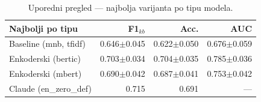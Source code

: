 \begin{table}[H]\centering
\caption{Uporedni pregled --- najbolja varijanta po tipu modela.}\label{tab:poredjenje}
\begin{tabular}{lrrr}
\toprule
Najbolji po tipu & F1$_{kb}$ & Acc. & AUC \\
\midrule
Baseline (mnb, tfidf) & 0.646$\pm$0.045 & 0.622$\pm$0.050 & 0.676$\pm$0.059 \\
Enkoderski (bertic) & 0.703$\pm$0.034 & 0.704$\pm$0.035 & 0.785$\pm$0.036 \\
Enkoderski (mbert) & 0.690$\pm$0.042 & 0.687$\pm$0.041 & 0.753$\pm$0.042 \\
Claude (en\_zero\_def) & 0.715 & 0.691 & — \\
\bottomrule
\end{tabular}
\end{table}
